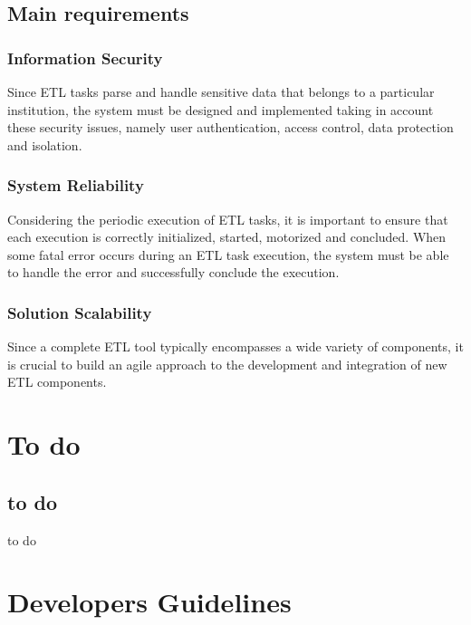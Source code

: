 \documentclass[
  11pt,
]{krantz}
\begin{document}
\hypertarget{main-requirements}{%
\section{Main requirements}\label{main-requirements}}

\hypertarget{information-security}{%
\subsection{Information Security}\label{information-security}}

Since ETL tasks parse and handle sensitive data that belongs to a particular institution, the system must be designed and implemented taking in account these security issues, namely user authentication, access control, data protection and isolation.

\hypertarget{system-reliability}{%
\subsection{System Reliability}\label{system-reliability}}

Considering the periodic execution of ETL tasks, it is important to ensure that each execution is correctly initialized, started, motorized and concluded. When some fatal error occurs during an ETL task execution, the system must be able to handle the error and successfully conclude the execution.

\hypertarget{solution-scalability}{%
\subsection{Solution Scalability}\label{solution-scalability}}

Since a complete ETL tool typically encompasses a wide variety of components, it is crucial to build an agile approach to the development and integration of new ETL components.

\hypertarget{to-do}{%
\chapter{To do}\label{to-do}}

\hypertarget{to-do-1}{%
\section{to do}\label{to-do-1}}

to do

\hypertarget{developers-guidelines}{%
\chapter{Developers Guidelines}\label{developers-guidelines}}
\end{document}
